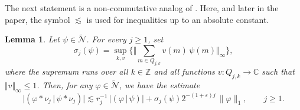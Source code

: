 \documentclass[12pt]{amsart}
\newcommand{\Zdb}{\mbox{$\mathbb{Z}$}}
\newcommand{\N}{\mbox{${\mathcal N}$}}
\newcommand{\norm}[1]{\Vert#1\Vert}
\newcommand{\biggnorm}[1]{\biggl\Vert#1\biggl\Vert}
\newtheorem{lemma}[theorem]{Lemma}
\theoremstyle{remark}
\theoremstyle{definition}
\numberwithin{equation}{section}
\begin{document}
The next statement is a non-commutative analog of \cite[Lemma 3.2]{LaV}. Here, and later in the paper,
the symbol $\lesssim$ is used for inequalities
up to an absolute constant.

\begin{lemma}\label{analog LaV prop 3.1}
Let $\psi\in\widetilde{\N}$.
For every $j\geq 1$, set
$$
\sigma_j(\psi)=\sup_{k,v}\Biggl\{\biggnorm{
\sum_{m\in Q_{j,k}}v(m)\,\psi(m)}_\infty\Biggr\},
$$
where the supremum runs over all $k\in\Zdb$ and all
functions $v\colon Q_{j,k}\to\mathbb C$ such that $\norm{v}_\infty\leq 1$.
Then, for any $\varphi\in\widetilde{\N}$, we have the estimate
\begin{equation}\label{4Key}
\bigl|( \varphi*\nu_j\,\vert \,\psi*\nu_j)\bigr|
\lesssim
r_j^{-1}\,|( \varphi \,\vert\, \psi )|
+
\sigma_j(\psi) 2^{-(1+\varepsilon)j}\,
\|\varphi\|_1,\qquad j\geq 1.
\end{equation}
\end{lemma}
\end{document}

